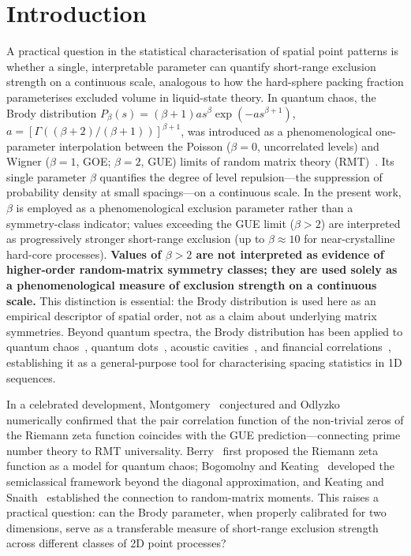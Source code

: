 \documentclass[final,1p,times]{elsarticle}
\theoremstyle{definition}
\begin{document}

\section{Introduction}

A practical question in the statistical characterisation of spatial
point patterns is whether a single, interpretable parameter can
quantify short-range exclusion strength on a continuous scale,
analogous to how the hard-sphere packing fraction parameterises
excluded volume in liquid-state theory. In quantum chaos,
the Brody distribution
$P_\beta(s) = (\beta+1) a s^\beta \exp(-a s^{\beta+1})$,
$a = [\Gamma((\beta+2)/(\beta+1))]^{\beta+1}$,
was introduced as a phenomenological one-parameter interpolation
between the Poisson ($\beta=0$, uncorrelated levels) and Wigner
($\beta=1$, GOE; $\beta=2$, GUE) limits of random matrix theory
(RMT)~\cite{BRODY-1981}. Its single parameter
$\beta$ quantifies the degree of level repulsion---the suppression
of probability density at small spacings---on a continuous scale. In the present work, $\beta$ is employed
as a phenomenological exclusion parameter rather than a
symmetry-class indicator; values exceeding the GUE limit
($\beta>2$) are interpreted as progressively stronger
short-range exclusion (up to $\beta\approx 10$ for near-crystalline
hard-core processes). \textbf{Values of $\beta>2$ are not interpreted
as evidence of higher-order random-matrix symmetry classes; they are
used solely as a phenomenological measure of exclusion strength on a
continuous scale.} This distinction is essential: the Brody
distribution is used here as an empirical descriptor of spatial
order, not as a claim about underlying matrix symmetries.
Beyond quantum spectra, the Brody distribution has been applied
to quantum chaos~\cite{STOCKMANN-1999}, quantum dots~\cite{ALHASSID-2000},
acoustic cavities~\cite{WEAVER-1989}, and financial
correlations~\cite{LALOUX-1999}, establishing it as a general-purpose
tool for characterising spacing statistics in 1D sequences.

In a celebrated development, Montgomery~\cite{MONTGOMERY-1973} conjectured
and Odlyzko~\cite{ODLYZKO-1987} numerically confirmed that the pair
correlation function of the non-trivial zeros of the Riemann zeta
function coincides with the GUE prediction---connecting prime number
theory to RMT universality. Berry~\cite{BERRY-1986} first proposed the
Riemann zeta function as a model for quantum chaos; Bogomolny and
Keating~\cite{BOGOMOLNY-1996} developed the semiclassical framework
beyond the diagonal approximation, and Keating and
Snaith~\cite{KEATING-1999} established the connection to random-matrix
moments.
This raises a practical question: can the Brody parameter, when
properly calibrated for two dimensions, serve as a transferable
measure of short-range exclusion strength across different classes
of 2D point processes?
\end{document}

